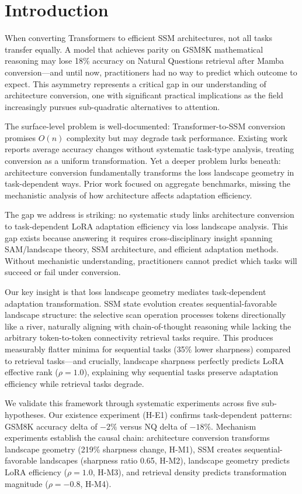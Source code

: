 \section{Introduction}

When converting Transformers to efficient SSM architectures, not all tasks transfer equally. A model that achieves parity on GSM8K mathematical reasoning may lose 18\% accuracy on Natural Questions retrieval after Mamba conversion---and until now, practitioners had no way to predict which outcome to expect. This asymmetry represents a critical gap in our understanding of architecture conversion, one with significant practical implications as the field increasingly pursues sub-quadratic alternatives to attention.

The surface-level problem is well-documented: Transformer-to-SSM conversion promises $O(n)$ complexity but may degrade task performance. Existing work reports average accuracy changes without systematic task-type analysis, treating conversion as a uniform transformation. Yet a deeper problem lurks beneath: architecture conversion fundamentally transforms the loss landscape geometry in task-dependent ways. Prior work focused on aggregate benchmarks, missing the mechanistic analysis of how architecture affects adaptation efficiency.

The gap we address is striking: no systematic study links architecture conversion to task-dependent LoRA adaptation efficiency via loss landscape analysis. This gap exists because answering it requires cross-disciplinary insight spanning SAM/landscape theory, SSM architecture, and efficient adaptation methods. Without mechanistic understanding, practitioners cannot predict which tasks will succeed or fail under conversion.

Our key insight is that loss landscape geometry mediates task-dependent adaptation transformation. SSM state evolution creates sequential-favorable landscape structure: the selective scan operation processes tokens directionally like a river, naturally aligning with chain-of-thought reasoning while lacking the arbitrary token-to-token connectivity retrieval tasks require. This produces measurably flatter minima for sequential tasks (35\% lower sharpness) compared to retrieval tasks---and crucially, landscape sharpness perfectly predicts LoRA effective rank ($\rho=1.0$), explaining why sequential tasks preserve adaptation efficiency while retrieval tasks degrade.

We validate this framework through systematic experiments across five sub-hypotheses. Our existence experiment (H-E1) confirms task-dependent patterns: GSM8K accuracy delta of $-2\%$ versus NQ delta of $-18\%$. Mechanism experiments establish the causal chain: architecture conversion transforms landscape geometry (219\% sharpness change, H-M1), SSM creates sequential-favorable landscapes (sharpness ratio 0.65, H-M2), landscape geometry predicts LoRA efficiency ($\rho=1.0$, H-M3), and retrieval density predicts transformation magnitude ($\rho=-0.8$, H-M4).

